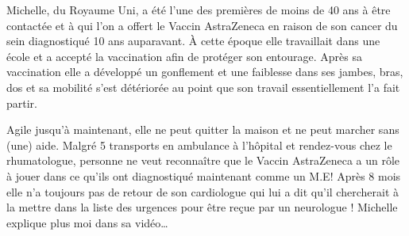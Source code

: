 Michelle, du Royaume Uni, a été l’une des premières de moins de 40 ans à être
contactée et à qui l’on a offert le Vaccin AstraZeneca en raison de son cancer
du sein diagnostiqué 10 ans auparavant. À cette époque elle travaillait dans une
école et a accepté la vaccination afin de protéger son entourage. Après sa
vaccination elle a développé un gonflement et une faiblesse dans ses jambes,
bras, dos et sa mobilité s’est détériorée au point que son travail
essentiellement l’a fait partir.

Agile jusqu’à maintenant, elle ne peut quitter la maison et ne peut marcher sans
(une) aide. Malgré 5 transports en ambulance à l’hôpital et rendez-vous chez le
rhumatologue, personne ne veut reconnaître que le Vaccin AstraZeneca a un rôle à
jouer dans ce qu’ils ont diagnostiqué maintenant comme un M.E! Après 8 mois elle
n’a toujours pas de retour de son cardiologue qui lui a dit qu’il chercherait à
la mettre dans la liste des urgences pour être reçue par un neurologue !
Michelle explique plus moi dans sa vidéo…

